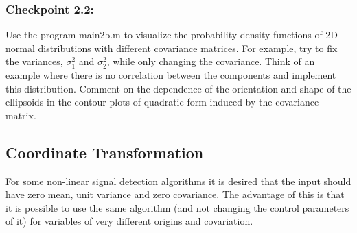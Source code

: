\documentclass[times,12pt]{article}    %
\def\x{{\bf x}}
\begin{document}
\iffalse
\vspace{1cm}\\
\fbox{\parbox[t]{0.95\textwidth}{{\bf Example 1:}\newline Imagine
    describing a person by a 2D variable consisting of the following
    components: $x_1$, the height of the person, and $x_2$, the
    weight of the person. If all people had the exact same shape,
    there would be an exact relationship between the weight and
    height of a person. However, in real life, the shapes and sizes
    of people vary somewhat. But there is a trend that tall people
    usually weigh more than short people. So although there is no
    exact relation between height and weight, they are said to
    correlate positively and the covariance between height and
    weight, $\sigma_{12}$, is positive. $\sigma_1^2$ is the variance
    of the height of people regardless of their weight, and
    $\sigma_2^2$ is the variance of the weight of people regardless
    of their height. }}
\vspace{0.5cm}\\
\fbox{\parbox[t]{0.95\textwidth}{{\bf Example 2:}\newline
    Imagine another example where the components of \x\ are $x_1$, the
    height of a person, and $x_2$, the number of steps this person
    needs to walk 1~km. Again there is no exact relationship, but one
    would expect that the taller the person, the longer the steps, and
    hence the fewer steps needed. In this case $\sigma_{12}$ is
    negative.  }  }
\fi
\subsubsection*{Checkpoint 2.2:}
Use the program {\sf main2b.m} to visualize the probability density
functions of 2D normal distributions with different covariance
matrices. For example, try to fix the variances,
$\sigma_1^2$ and $\sigma_2^2$, while only changing the covariance.
Think of an example where there is no correlation between the
components and implement this distribution.  Comment on the dependence
of the orientation and shape of the ellipsoids in the contour plots of
quadratic form induced by the covariance matrix.

\subsection*{Coordinate Transformation}
For some non-linear signal detection algorithms
it is desired that the input should have zero mean, unit variance and
zero covariance. The advantage of this is that it is possible to use
the same algorithm (and not changing the control parameters of it)
 for variables of very different origins and covariation.
\end{document}
